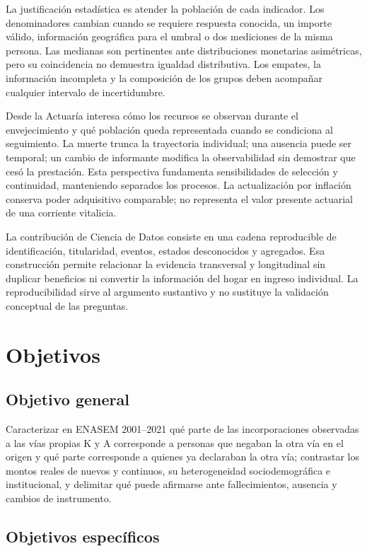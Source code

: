 La justificación estadística es atender la población de cada indicador.
Los denominadores cambian cuando se requiere respuesta conocida, un importe
válido, información geográfica para el umbral o dos mediciones de la misma
persona. Las medianas son pertinentes ante distribuciones monetarias
asimétricas, pero su coincidencia no demuestra igualdad distributiva. Los
empates, la información incompleta y la composición de los grupos deben
acompañar cualquier intervalo de incertidumbre.

Desde la Actuaría interesa cómo los recursos se observan durante el
envejecimiento y qué población queda representada cuando se condiciona al
seguimiento. La muerte trunca la trayectoria individual; una ausencia puede
ser temporal; un cambio de informante modifica la observabilidad sin
demostrar que cesó la prestación. Esta perspectiva fundamenta sensibilidades
de selección y continuidad, manteniendo separados los procesos. La actualización
por inflación conserva poder adquisitivo comparable; no representa el valor
presente actuarial de una corriente vitalicia.

La contribución de Ciencia de Datos consiste en una cadena reproducible
de identificación, titularidad, eventos, estados desconocidos y agregados.
Esa construcción permite relacionar la evidencia transversal y longitudinal
sin duplicar beneficios ni convertir la información del hogar en ingreso
individual. La reproducibilidad sirve al argumento sustantivo y no sustituye
la validación conceptual de las preguntas.

\section{Objetivos}

\subsection{Objetivo general}

Caracterizar en ENASEM 2001--2021 qué parte de las incorporaciones
observadas a las vías propias K y A corresponde a personas que negaban la
otra vía en el origen y qué parte corresponde a quienes ya declaraban la otra vía; contrastar los montos reales de nuevos y continuos, su
heterogeneidad sociodemográfica e institucional, y delimitar qué puede
afirmarse ante fallecimientos, ausencia y cambios de instrumento.

\subsection{Objetivos específicos}

